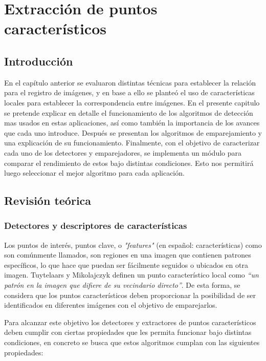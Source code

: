 \chapter{Extracción de puntos característicos}
\label{capitulo3}


\section{Introducción}

En el capítulo anterior se evaluaron distintas técnicas para establecer la relación para el registro de imágenes, y en base a ello se planteó el uso de características locales para establecer la correspondencia entre imágenes. En el presente capitulo se pretende explicar en detalle el funcionamiento de los algoritmos de detección mas usados en estas aplicaciones, así como también la importancia de los avances que cada uno introduce. Después se presentan los algoritmos de emparejamiento y una explicación de su funcionamiento. Finalmente, con el objetivo de caracterizar cada uno de los detectores y emparejadores, se implementa un módulo para comparar el rendimiento de estos bajo distintas condiciones. Esto nos permitirá luego seleccionar el mejor algoritmo para cada aplicación.

\section{Revisión teórica}

\subsection{Detectores y descriptores de características}

Los puntos de interés, puntos clave, o \textit{"features"} (en español: características) como son comúnmente llamados, son regiones en una imagen que contienen patrones específicos, lo que hace que puedan ser fácilmente seguidos o ubicados en otra imagen. Tuytelaars y Mikolajczyk \cite{Tuytelaars} definen un punto característico local como \textit{``un patrón en la imagen que difiere de su vecindario directo''}. De esta forma, se considera que los puntos característicos deben proporcionar la posibilidad de ser identificados en diferentes imágenes con el objetivo de emparejarlos.

Para alcanzar este objetivo los detectores y extractores de puntos característicos deben cumplir con ciertas propiedades que les permita funcionar bajo distintas condiciones, en concreto se busca que estos algoritmos cumplan con las siguientes propiedades:


